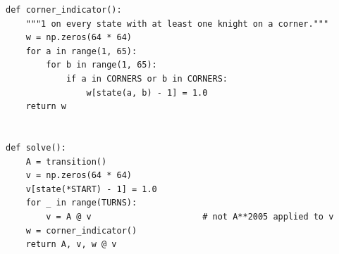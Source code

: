 \begin{verbatim}
def corner_indicator():
    """1 on every state with at least one knight on a corner."""
    w = np.zeros(64 * 64)
    for a in range(1, 65):
        for b in range(1, 65):
            if a in CORNERS or b in CORNERS:
                w[state(a, b) - 1] = 1.0
    return w


def solve():
    A = transition()
    v = np.zeros(64 * 64)
    v[state(*START) - 1] = 1.0
    for _ in range(TURNS):
        v = A @ v                      # not A**2005 applied to v
    w = corner_indicator()
    return A, v, w @ v
\end{verbatim}
